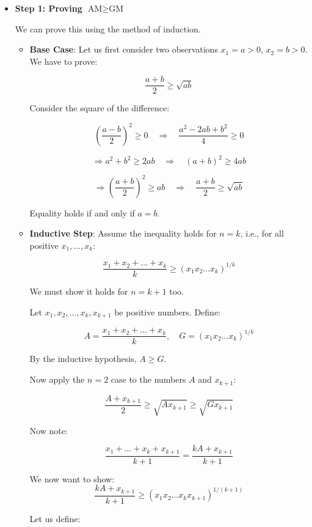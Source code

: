 \documentclass[twoside]{book}
\begin{document}
\medskip
\begin{itemize}
\item \textbf{Step 1: Proving \( \text{AM} \geq \text{GM} \)}

We can prove this using the method of induction.

\begin{itemize}

\item  \textbf{Base Case}: Let us first consider two observations \( x_1 = a > 0 \), \( x_2 = b > 0 \). We have to prove:

\[
\frac{a + b}{2} \geq \sqrt{ab}
\]

Consider the square of the difference:

\[
\left( \frac{a - b}{2} \right)^2 \geq 0 \quad \Rightarrow \quad \frac{a^2 - 2ab + b^2}{4} \geq 0
\]

\[
\Rightarrow a^2 + b^2 \geq 2ab \quad \Rightarrow \quad (a + b)^2 \geq 4ab
\]

\[
\Rightarrow \left( \frac{a + b}{2} \right)^2 \geq ab \quad \Rightarrow \quad \frac{a + b}{2} \geq \sqrt{ab}
\]

Equality holds if and only if \( a = b \).

\medskip

\item \textbf{Inductive Step}: Assume the inequality holds for \( n = k \), i.e., for all positive \( x_1, \dots, x_k \):

\[
\frac{x_1 + x_2 + \dots + x_k}{k} \geq \left( x_1 x_2 \dots x_k \right)^{1/k}
\]

We must show it holds for \( n = k+1 \) too.

Let \( x_1, x_2, \dots, x_k, x_{k+1} \) be positive numbers. Define:

\[
A = \frac{x_1 + x_2 + \dots + x_k}{k}, \quad G = \left( x_1 x_2 \dots x_k \right)^{1/k}
\]

By the inductive hypothesis, \( A \geq G \).

Now apply the \( n = 2 \) case to the numbers \( A \) and \( x_{k+1} \):

\[
\frac{A + x_{k+1}}{2} \geq \sqrt{A x_{k+1}} \geq \sqrt{G x_{k+1}}
\]

Now note:

\[
\frac{x_1 + \dots + x_k + x_{k+1}}{k+1} = \frac{kA + x_{k+1}}{k+1}
\]

We now want to show:
\[
\frac{kA + x_{k+1}}{k+1} \geq \left( x_1 x_2 \dots x_k x_{k+1} \right)^{1/(k+1)}
\]

Let us define:


\end{itemize}
\end{itemize}
\end{document}
